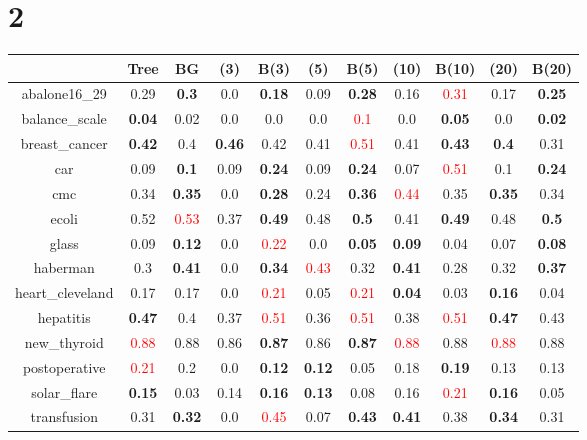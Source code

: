 \documentclass{article}%
\begin{document}
\section*{2}%
\begin{tabular}{c|cccccccccc}%
\hline%
&Tree&BG&(3)&B(3)&(5)&B(5)&(10)&B(10)&(20)&B(20)\\%
\hline%
abalone16\_29&0.29&\textbf{0.3}&0.0&\textbf{0.18}&0.09&\textbf{0.28}&0.16&\textcolor{red}{ 
0.31
}&0.17&\textbf{0.25}\\%
\hline%
balance\_scale&\textbf{0.04}&0.02&0.0&0.0&0.0&\textcolor{red}{ 
0.1
}&0.0&\textbf{0.05}&0.0&\textbf{0.02}\\%
\hline%
breast\_cancer&\textbf{0.42}&0.4&\textbf{0.46}&0.42&0.41&\textcolor{red}{ 
0.51
}&0.41&\textbf{0.43}&\textbf{0.4}&0.31\\%
\hline%
car&0.09&\textbf{0.1}&0.09&\textbf{0.24}&0.09&\textbf{0.24}&0.07&\textcolor{red}{ 
0.51
}&0.1&\textbf{0.24}\\%
\hline%
cmc&0.34&\textbf{0.35}&0.0&\textbf{0.28}&0.24&\textbf{0.36}&\textcolor{red}{ 
0.44
}&0.35&\textbf{0.35}&0.34\\%
\hline%
ecoli&0.52&\textcolor{red}{ 
0.53
}&0.37&\textbf{0.49}&0.48&\textbf{0.5}&0.41&\textbf{0.49}&0.48&\textbf{0.5}\\%
\hline%
glass&0.09&\textbf{0.12}&0.0&\textcolor{red}{ 
0.22
}&0.0&\textbf{0.05}&\textbf{0.09}&0.04&0.07&\textbf{0.08}\\%
\hline%
haberman&0.3&\textbf{0.41}&0.0&\textbf{0.34}&\textcolor{red}{ 
0.43
}&0.32&\textbf{0.41}&0.28&0.32&\textbf{0.37}\\%
\hline%
heart\_cleveland&0.17&0.17&0.0&\textcolor{red}{ 
0.21
}&0.05&\textcolor{red}{ 
0.21
}&\textbf{0.04}&0.03&\textbf{0.16}&0.04\\%
\hline%
hepatitis&\textbf{0.47}&0.4&0.37&\textcolor{red}{ 
0.51
}&0.36&\textcolor{red}{ 
0.51
}&0.38&\textcolor{red}{ 
0.51
}&\textbf{0.47}&0.43\\%
\hline%
new\_thyroid&\textcolor{red}{ 
0.88
}&0.88&0.86&\textbf{0.87}&0.86&\textbf{0.87}&\textcolor{red}{ 
0.88
}&0.88&\textcolor{red}{ 
0.88
}&0.88\\%
\hline%
postoperative&\textcolor{red}{ 
0.21
}&0.2&0.0&\textbf{0.12}&\textbf{0.12}&0.05&0.18&\textbf{0.19}&0.13&0.13\\%
\hline%
solar\_flare&\textbf{0.15}&0.03&0.14&\textbf{0.16}&\textbf{0.13}&0.08&0.16&\textcolor{red}{ 
0.21
}&\textbf{0.16}&0.05\\%
\hline%
transfusion&0.31&\textbf{0.32}&0.0&\textcolor{red}{ 
0.45
}&0.07&\textbf{0.43}&\textbf{0.41}&0.38&\textbf{0.34}&0.31\\%

\end{tabular}
\end{document}

